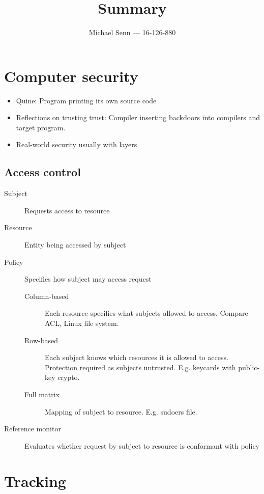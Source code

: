 \documentclass[a4paper]{scrreprt}
\title{Summary}
\author{Michael Senn \maillink{michael.senn@students.unibe.ch} --- 16-126-880}
\date{\printdate}
\begin{document}
\maketitle

\chapter{Computer security}

\begin{itemize}
		\item Quine: Program printing its own source code
		\item Reflections on trusting trust: Compiler inserting backdoors into
				compilers and target program.
		\item Real-world security usually with layers
\end{itemize}

\section{Access control}

\begin{description}
		\item[Subject] Requests access to resource
		\item[Resource] Entity being accessed by subject
		\item[Policy] Specifies how subject may access request
				\begin{description}
						\item[Column-based] Each resource specifies what
								subjects allowed to access. Compare ACL, Linux
								file system.
						\item[Row-based] Each subject knows which resources it
								is allowed to access. Protection required as
								subjects untrusted. E.g. keycards with
								public-key crypto.
						\item[Full matrix] Mapping of subject to resource. E.g.
								sudoers file.
				\end{description}
		\item[Reference monitor] Evaluates whether request by subject to
				resource is conformant with policy
\end{description}

\chapter{Tracking}
\end{document}
